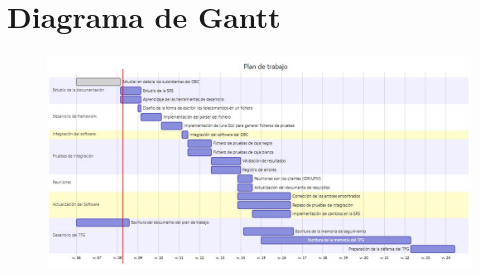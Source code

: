 
\section{Diagrama de Gantt}
\begin{figure}[h]
  \hspace*{-3.75cm}%
  \includegraphics[scale=0.65]{fig/plan.JPG}
  \hspace*{-3.75cm}%
\end{figure}

